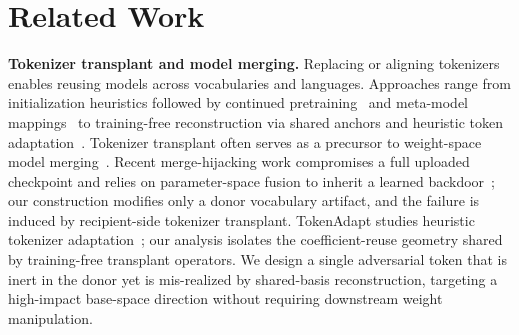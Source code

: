 \documentclass{article}
\theoremstyle{plain}
\theoremstyle{definition}
\theoremstyle{remark}
\begin{document}


\vspace{-2mm}
\section{Related Work}
\label{sec:related}
\vspace{-1mm}

\noindent\textbf{Tokenizer transplant and model merging.}
Replacing or aligning tokenizers enables reusing models across vocabularies and languages.
Approaches range from initialization heuristics followed by continued pretraining~\citep{minixhofer2021wechsel,dobler2023focus,pfeiffer2021unks,artetxe2020cross,vernikos2021subword,remy2023tik} and meta-model mappings~\citep{minixhofer2024zett,remy2024trans,minixhofer2025universal} to training-free reconstruction via shared anchors and heuristic token adaptation~\citep{goddard2025tftransplant,tokalign2025,yamaguchi2024empirical,yamaguchi2025how,mundra2024empirical,li2025tokalign,downey2023embedding,lee2025semantic,jiang2025franken,moroni2025optimizing,feher2025retrofitting,rust2021good,sharthak2025tokenadapt}.
Tokenizer transplant often serves as a precursor to weight-space model merging~\citep{wortsman2022soups,matena2021fisher,yadav2023ties,mergekit2024,yang2024modelstock}. Recent merge-hijacking work compromises a full uploaded checkpoint and relies on parameter-space fusion to inherit a learned backdoor~\citep{yuan2025mergehijacking}; our construction modifies only a donor vocabulary artifact, and the failure is induced by recipient-side tokenizer transplant. TokenAdapt studies heuristic tokenizer adaptation~\citep{sharthak2025tokenadapt}; our analysis isolates the coefficient-reuse geometry shared by training-free transplant operators.
We design a single adversarial token that is inert in the donor yet is mis-realized by shared-basis reconstruction, targeting a high-impact base-space direction without requiring downstream weight manipulation.
\end{document}
